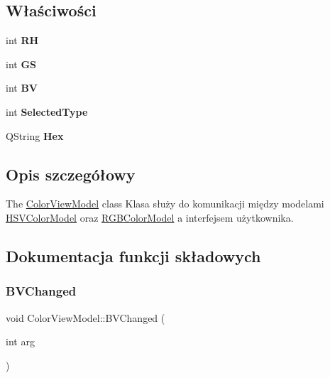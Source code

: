 \subsection*{Właściwości}
\begin{DoxyCompactItemize}
\item 
\mbox{\label{class_color_view_model_ae0f5138a9621f84b1ded3ecff66d7762}} 
int {\bfseries RH}
\item 
\mbox{\label{class_color_view_model_a01554860f6ce1c2cc9be53085c6be31f}} 
int {\bfseries GS}
\item 
\mbox{\label{class_color_view_model_ab56668fbfd75bd38ba255b0d7bf209e3}} 
int {\bfseries BV}
\item 
\mbox{\label{class_color_view_model_ad9b6fd8d70e82197261dde9e25f53373}} 
int {\bfseries Selected\+Type}
\item 
\mbox{\label{class_color_view_model_a5f3c225efc04ea48dd0be3133da6c660}} 
Q\+String {\bfseries Hex}
\end{DoxyCompactItemize}


\subsection{Opis szczegółowy}
The \mbox{\hyperlink{class_color_view_model}{Color\+View\+Model}} class Klasa służy do komunikacji między modelami \mbox{\hyperlink{class_h_s_v_color_model}{H\+S\+V\+Color\+Model}} oraz \mbox{\hyperlink{class_r_g_b_color_model}{R\+G\+B\+Color\+Model}} a interfejsem użytkownika. 

\subsection{Dokumentacja funkcji składowych}
\mbox{\label{class_color_view_model_a242d8b688b15906ff79ab0a01f5877fc}} 
\subsubsection{\texorpdfstring{B\+V\+Changed}{BVChanged}}
{\footnotesize\ttfamily void Color\+View\+Model\+::\+B\+V\+Changed (\begin{DoxyParamCaption}\item[{int}]{arg }\end{DoxyParamCaption})\hspace{0.3cm}{\ttfamily [signal]}}



